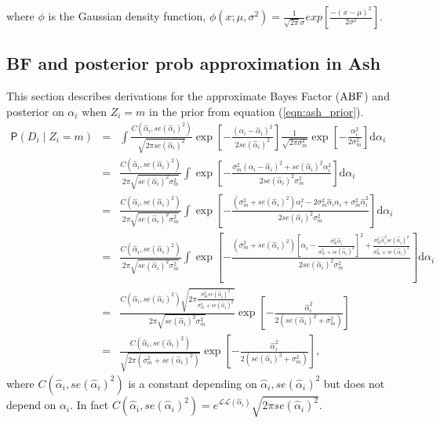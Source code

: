 \documentclass[12pt,letterpaper]{article}
\renewcommand{\Pr}{\mathsf{P}}
\newcommand{\given}{\mid}
\newcommand{\loglike}{\mathcal{L}\mathcal{L}}
\newcommand{\nin}{\noindent}
\def\ABF{\rm ABF}
\begin{document}
\nin where $\phi$ is the Gaussian density function, $\phi(x ; \mu, \sigma^2) = \frac{1}{\sqrt{2\pi} \sigma} exp [\frac{-(x-\mu)^2}{2\sigma^2}]$.

\subsection{BF and posterior prob approximation in Ash}
\label{sec:BF_post_Ash}
This section describes derivations for the approximate Bayes Factor ($\ABF$) and posterior on $\alpha_i$ when $Z_i = m$ in the prior from equation (\ref{eqn:ash_prior}).
\begin{eqnarray}
\Pr(D_i \given Z_i = m) &=& \int \frac{C(\hat{\alpha}_i, se(\hat{\alpha}_i)^2)}{\sqrt {2\pi se(\hat{\alpha}_i)^2 } }\exp{[-\frac{\left(\alpha_i -  \hat{\alpha}_i\right)^2}{2se(\hat{\alpha}_i)^2}]} \frac{1}{\sqrt {2\pi \sigma^2_m } }\exp{[-\frac{\alpha_i^2}{2\sigma^2_m}]}\mathrm{d}\alpha_i\\
	&=&  \frac{C(\hat{\alpha}_i, se(\hat{\alpha}_i)^2)}{2\pi \sqrt {se(\hat{\alpha}_i)^2  \sigma^2_m }} \int \exp{[-\frac{\sigma^2_m\left(\alpha_i -  \hat{\alpha}_i\right)^2 + se(\hat{\alpha}_i)^2\alpha_i^2}{2se(\hat{\alpha}_i)^2\sigma^2_m}]}\mathrm{d}\alpha_i\\
	&=&  \frac{C(\hat{\alpha}_i, se(\hat{\alpha}_i)^2)}{2\pi \sqrt {se(\hat{\alpha}_i)^2  \sigma^2_m }} \int \exp{[-\frac{ \left(\sigma^2_m + se(\hat{\alpha}_i)^2\right)\alpha_i^2 - 2\sigma^2_m \hat{\alpha}_i\alpha_i + \sigma^2_m\hat{\alpha}^2_i}{2se(\hat{\alpha}_i)^2\sigma^2_m}]}\mathrm{d}\alpha_i\\
	&=&  \frac{C(\hat{\alpha}_i, se(\hat{\alpha}_i)^2)}{2\pi \sqrt {se(\hat{\alpha}_i)^2  \sigma^2_m }} \int \exp{[-\frac{\left(\sigma^2_m + se(\hat{\alpha}_i)^2\right)[\alpha_i- \frac{\sigma^2_m \hat{\alpha}_i}{\sigma^2_m + se(\hat{\alpha}_i)^2}]^2 + \frac{\sigma^2_m \hat{\alpha}^2_i se(\hat{\alpha}_i)^2}{\sigma^2_m + se(\hat{\alpha}_i)^2}}{2se(\hat{\alpha}_i)^2\sigma^2_m}]}\mathrm{d}\alpha_i\\
	&=&  \frac{C(\hat{\alpha}_i, se(\hat{\alpha}_i)^2)\sqrt{2\pi \frac{\sigma^2_m se(\hat{\alpha}_i)^2}{\sigma^2_m + se(\hat{\alpha}_i)^2}}}{2\pi \sqrt {se(\hat{\alpha}_i)^2  \sigma^2_m }} \exp{[-\frac{\hat{\alpha}^2_i}{2(se(\hat{\alpha}_i)^2+\sigma^2_m)}]}\\
	&=&  \frac{C(\hat{\alpha}_i, se(\hat{\alpha}_i)^2)}{\sqrt{2\pi (\sigma^2_m + se(\hat{\alpha}_i)^2)}} \exp{[-\frac{\hat{\alpha}^2_i}{2(se(\hat{\alpha}_i)^2+\sigma^2_m)}]},
\end{eqnarray}
where $C(\hat{\alpha}_i, se(\hat{\alpha}_i)^2)$ is a constant depending on $\hat{\alpha}_i, se(\hat{\alpha}_i)^2$ but does not 
depend on $\alpha_i$. In fact $C(\hat{\alpha}_i, se(\hat{\alpha}_i)^2) = e^{\loglike(\hat{\alpha}_i)} \sqrt{2\pi se(\hat{\alpha}_i)^2}$.
\end{document}
